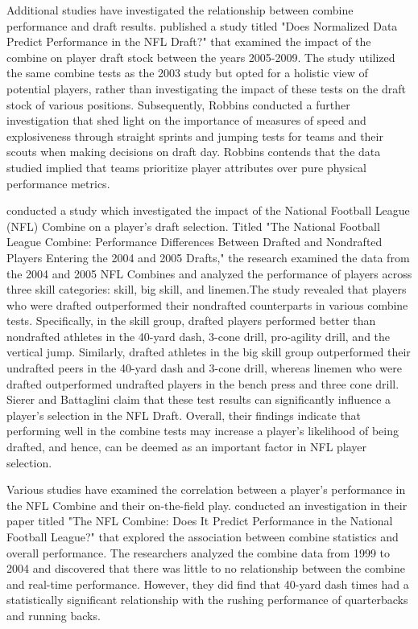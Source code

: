 \documentclass[12pt,english]{article}
\begin{document}
Additional studies have investigated the relationship between combine performance and draft results. \citet{Robbins2010TheNF} published a study titled "Does Normalized Data Predict Performance in the NFL Draft?" that examined the impact of the combine on player draft stock between the years 2005-2009. The study utilized the same combine tests as the 2003 study but opted for a holistic view of potential players, rather than investigating the impact of these tests on the draft stock of various positions. Subsequently, Robbins conducted a further investigation that shed light on the importance of measures of speed and explosiveness through straight sprints and jumping tests for teams and their scouts when making decisions on draft day. Robbins contends that the data studied implied that teams prioritize player attributes over pure physical performance metrics.

\citet{Sierer2008TheNF} conducted a study which investigated the impact of the National Football League (NFL) Combine on a player's draft selection. Titled "The National Football League Combine: Performance Differences Between Drafted and Nondrafted Players Entering the 2004 and 2005 Drafts," the research examined the data from the 2004 and 2005 NFL Combines and analyzed the performance of players across three skill categories: skill, big skill, and linemen.The study revealed that players who were drafted outperformed their nondrafted counterparts in various combine tests. Specifically, in the skill group, drafted players performed better than nondrafted athletes in the 40-yard dash, 3-cone drill, pro-agility drill, and the vertical jump. Similarly, drafted athletes in the big skill group outperformed their undrafted peers in the 40-yard dash and 3-cone drill, whereas linemen who were drafted outperformed undrafted players in the bench press and three cone drill. Sierer and Battaglini claim that these test results can significantly influence a player's selection in the NFL Draft. Overall, their findings indicate that performing well in the combine tests may increase a player's likelihood of being drafted, and hence, can be deemed as an important factor in NFL player selection.

Various studies have examined the correlation between a player's performance in the NFL Combine and their on-the-field play. \citet{Kuzmits2008TheNC} conducted an investigation in their paper titled "The NFL Combine: Does It Predict Performance in the National Football League?" that explored the association between combine statistics and overall performance. The researchers analyzed the combine data from 1999 to 2004 and discovered that there was little to no relationship between the combine and real-time performance. However, they did find that 40-yard dash times had a statistically significant relationship with the rushing performance of quarterbacks and running backs.
\end{document}
